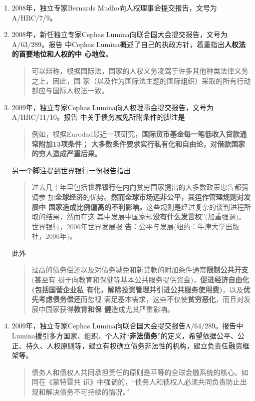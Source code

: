 \begin{enumerate}
\item 2008年，独立专家Bernards Mudho向人权理事会提交报告，文号为A/HRC/7/9。

\item 2008年，新任独立专家Cephas Lumina向联合国大会提交报告，文号为A/63/289。报告
  中Cephas Lumina概述了自己的执政方针，着重指出\textbf{人权法的首要地位和人权的中
    心地位}。
  \begin{quotation}
    可以辩称，根据国际法，国家的人权义务凌驾于许多其他种类法律义务之上，因此，国
    家（以及作为国际法主题的国际组织）采取的所有行动都应与国际人权法一致。
  \end{quotation}

\item 2009年，独立专家Cephas Lumina向人权理事会提交报告，文号为A/HRC/11/10。报告
  中关于债务减免所附条件的脚注是
  \begin{quotation}
    例如，根据Eurodad最近一项研究，\textbf{国际货币基金每一笔低收入贷款通常附加13项条件；
    大多数条件要求实行私有化和自由论，对借款国家的穷人造成严重后果。}
\end{quotation}

另一个脚注提到世界银行一份报告指出
\begin{quotation}
  过去几十年里包括\textbf{世界银行}在内向贫穷国家提出的大多数政策忠告都强调参
  加\textbf{全球经济}的优势。\textbf{然而全球市场远非公平，其运作管理规则对发展中
    国家造成比例偏高的不利影响。}这些规则是经过复杂的谈判进程所取的结果，然而在这
  其中发展中国家却\textbf{没有什么发言权}”(加重强调)。世界银行，2006年世界发展报
  告：公平与发展(纽约：牛津大学出版社，2006年)。
\end{quotation}

此外
\begin{quotation}
  过高的债务偿还以及对债务减免和新贷款的附加条件通常\textbf{限制公共开支}(甚至有
  损于向教育和保健等基本公共服务提供资金)，\textbf{促进经济自由化(包括国营企业私
    有化，解除投资管理并引进公共服务使用费)}，以及\textbf{优先考虑债务偿还}而忽视
  满足基本需求，这些不仅使\textbf{贫穷恶化}，而且对发展中国家获得\textbf{教育和保
    健}造成尤其严重影响。
  \end{quotation}

\item 2009年，独立专家Cephas Lumina向联合国大会提交报告A/64/289。报告中Lumina援引多方国家、组织、个人对“\textbf{非法债务}”的定义，希望依据公平、公正、持久、人权原则等，建立有权确立债务非法性的机构，建立负责任融资框架等。
  \begin{quotation}
    债务人和债权人共同承担责任的原则是平等的全球金融系统的核心。如同在《蒙特雷共
    识》中强调的，“债务人和债权人必须共同负责防止出现和解决债务不可持续的情况。”
  \end{quotation}


\end{enumerate}
